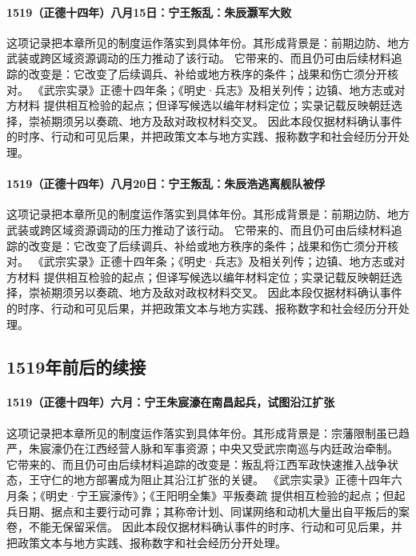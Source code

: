 \paragraph{1519（正德十四年）八月15日：宁王叛乱：朱辰灏军大败} 这项记录把本章所见的制度运作落实到具体年份。其形成背景是：前期边防、地方武装或跨区域资源调动的压力推动了该行动。 它带来的、而且仍可由后续材料追踪的改变是：它改变了后续调兵、补给或地方秩序的条件；战果和伤亡须分开核对。 《武宗实录》正德十四年条；《明史·兵志》及相关列传；边镇、地方志或对方材料 提供相互检验的起点；但译写候选以编年材料定位；实录记载反映朝廷选择，崇祯期须另以奏疏、地方及敌对政权材料交叉。 因此本段仅据材料确认事件的时序、行动和可见后果，并把政策文本与地方实践、报称数字和社会经历分开处理。

\paragraph{1519（正德十四年）八月20日：宁王叛乱：朱辰浩逃离舰队被俘} 这项记录把本章所见的制度运作落实到具体年份。其形成背景是：前期边防、地方武装或跨区域资源调动的压力推动了该行动。 它带来的、而且仍可由后续材料追踪的改变是：它改变了后续调兵、补给或地方秩序的条件；战果和伤亡须分开核对。 《武宗实录》正德十四年条；《明史·兵志》及相关列传；边镇、地方志或对方材料 提供相互检验的起点；但译写候选以编年材料定位；实录记载反映朝廷选择，崇祯期须另以奏疏、地方及敌对政权材料交叉。 因此本段仅据材料确认事件的时序、行动和可见后果，并把政策文本与地方实践、报称数字和社会经历分开处理。

\subsection{1519年前后的续接}

\paragraph{1519（正德十四年）六月：宁王朱宸濠在南昌起兵，试图沿江扩张} 这项记录把本章所见的制度运作落实到具体年份。其形成背景是：宗藩限制虽已趋严，朱宸濠仍在江西经营人脉和军事资源；中央又受武宗南巡与内廷政治牵制。 它带来的、而且仍可由后续材料追踪的改变是：叛乱将江西军政快速推入战争状态，王守仁的地方部署成为阻止其沿江扩张的关键。 《武宗实录》正德十四年六月条；《明史·宁王宸濠传》；《王阳明全集》平叛奏疏 提供相互检验的起点；但起兵日期、据点和主要行动可靠；其称帝计划、同谋网络和动机大量出自平叛后的案卷，不能无保留采信。 因此本段仅据材料确认事件的时序、行动和可见后果，并把政策文本与地方实践、报称数字和社会经历分开处理。


